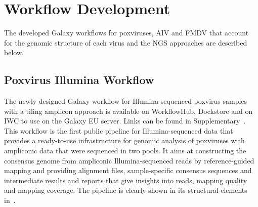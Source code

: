 \section{Workflow Development}
The developed Galaxy workflows for poxviruses, \ac{AIV} and \ac{FMDV} that account for the genomic structure of each virus and the \ac{NGS} approaches are described below.

\subsection{Poxvirus Illumina Workflow}\label{sec:pox-wf}
The newly designed Galaxy workflow for Illumina-sequenced poxvirus samples with a tiling amplicon approach is available on WorkflowHub, Dockstore and on \ac{IWC} to use on the Galaxy EU server. Links can be found in Supplementary~. \\
This workflow is the first public pipeline for Illumina-sequenced data that provides a ready-to-use infrastructure for genomic analysis of poxviruses with ampliconic data that were sequenced in two pools. It aims at constructing the consensus genome from ampliconic Illumina-sequenced reads by reference-guided mapping and providing alignment files, sample-specific consensus sequences and intermediate results and reports that give insights into reads, mapping quality and mapping coverage. The pipeline is clearly shown in its structural elements in~. \\ 

